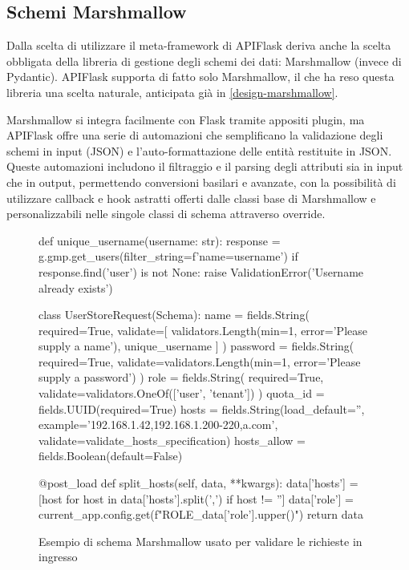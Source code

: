 \subsection{Schemi Marshmallow}
Dalla scelta di utilizzare il meta-framework di APIFlask deriva anche la scelta obbligata della libreria di gestione degli schemi dei dati: Marshmallow (invece di Pydantic). APIFlask supporta di fatto solo Marshmallow, il che ha reso questa libreria una scelta naturale, anticipata già in \ref{design-marshmallow}.

Marshmallow si integra facilmente con Flask tramite appositi plugin, ma APIFlask offre una serie di automazioni che semplificano la validazione degli schemi in input (JSON) e l'auto-formattazione delle entità restituite in JSON. Queste automazioni includono il filtraggio e il parsing degli attributi sia in input che in output, permettendo conversioni basilari e avanzate, con la possibilità di utilizzare callback e hook astratti offerti dalle classi base di Marshmallow e personalizzabili nelle singole classi di schema attraverso override.

\begin{figure}
\begin{pycode}
def unique_username(username: str):
    response = g.gmp.get_users(filter_string=f'name={username}')
    if response.find('user') is not None:
        raise ValidationError('Username already exists')


class UserStoreRequest(Schema):
    name = fields.String(
        required=True,
        validate=[
            validators.Length(min=1, error='Please supply a name'),
            unique_username
        ]
    )
    password = fields.String(
        required=True,
        validate=validators.Length(min=1, error='Please supply a password')
    )
    role = fields.String(
        required=True,
        validate=validators.OneOf(['user', 'tenant'])
    )
    quota_id = fields.UUID(required=True)
    hosts = fields.String(load_default='',
                          example='192.168.1.42,192.168.1.200-220,a.com',
                          validate=validate_hosts_specification)
    hosts_allow = fields.Boolean(default=False)

    @post_load
    def split_hosts(self, data, **kwargs):
        data['hosts'] = [host for host in data['hosts'].split(',') if host != '']
        data['role'] = current_app.config.get(f"ROLE_{data['role'].upper()}")
        return data
\end{pycode}
\caption{Esempio di schema Marshmallow usato per validare le richieste in ingresso}
\end{figure}

